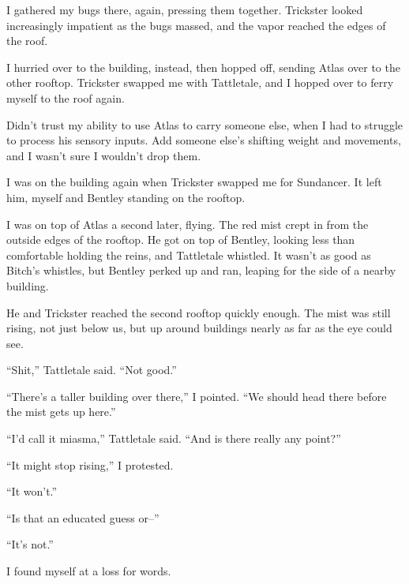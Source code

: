I gathered my bugs there, again, pressing them together.  Trickster looked increasingly impatient as the bugs massed, and the vapor reached the edges of the roof.



I hurried over to the building, instead, then hopped off, sending Atlas over to the other rooftop.  Trickster swapped me with Tattletale, and I hopped over to ferry myself to the roof again.



Didn't trust my ability to use Atlas to carry someone else, when I had to struggle to process his sensory inputs.  Add someone else's shifting weight and movements, and I wasn't sure I wouldn't drop them.



I was on the building again when Trickster swapped me for Sundancer.  It left him, myself and Bentley standing on the rooftop.



I was on top of Atlas a second later, flying.  The red mist crept in from the outside edges of the rooftop.  He got on top of Bentley, looking less than comfortable holding the reins, and Tattletale whistled.  It wasn't as good as Bitch's whistles, but Bentley perked up and ran, leaping for the side of a nearby building.



He and Trickster reached the second rooftop quickly enough.  The mist was still rising, not just below us, but up around buildings nearly as far as the eye could see.



``Shit,''  Tattletale said.  ``Not good.''



``There's a taller building over there,'' I pointed.  ``We should head there before the mist gets up here.''



``I'd call it miasma,'' Tattletale said.  ``And is there really any point?''



``It might stop rising,'' I protested.



``It won't.''



``Is that an educated guess or--''



``It's not.''



I found myself at a loss for words.



